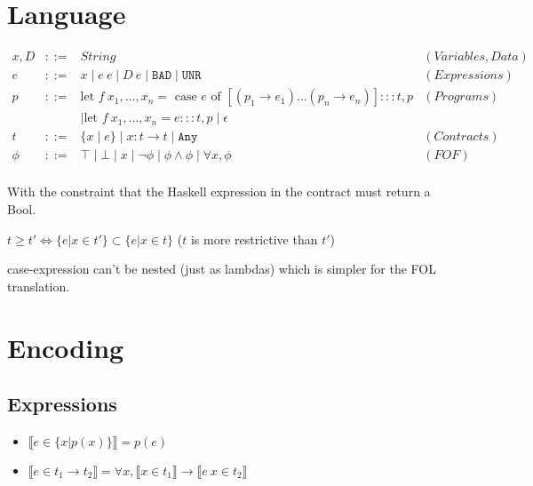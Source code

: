 \documentclass{article}
\begin{document}
\section{Language}

\newcommand{\unr}{\texttt{UNR}}
\newcommand{\unrphi}{\texttt{UNR}_\phi}
\newcommand{\bad}{\texttt{BAD}}
\newcommand{\badphi}{\texttt{BAD}_\phi}
\newcommand{\any}{\texttt{Any}}
\newcommand{\ok}{\texttt{Ok}}
\newcommand{\let}{\mbox{let }}
\newcommand{\mand}{\mbox{ and }}
\newcommand{\motherwise}{\mbox{ otherwise.}}

\begin{eqnarray*}
  x,D &::=& String & (Variables, Data)\\
  e &::=& x \mid e~e \mid D~e \mid \bad \mid \unr & (Expressions) \\
  p &::=& \mbox{let $f~x_1,\dots,x_n = $ case $e$ of } [(p_1 \to e_1) \dots (p_n \to e_n)] ::: t,p   & (Programs) \\ 
  &&\mid \mbox{let } f~x_1,\dots,x_n = e ::: t,p \mid \epsilon \\
  t &::=& \{x \mid e \} \mid x:t \to t \mid \any & (Contracts) \\
  \phi &::=& \top \mid \bot \mid x \mid \lnot \phi \mid \phi \land \phi \mid \forall x, \phi & (FOF) \\
\end{eqnarray*}

With the constraint that the Haskell expression in the contract must return a Bool.

$t \geq t' \iff \{ e | x \in t' \} \subset \{ e | x \in t \}$ ($t$ is more restrictive than $t'$)

case-expression can't be nested (just as lambdas) which is simpler for the FOL translation.

\section{Encoding}


\subsection{Expressions}
\begin{itemize}
\item $\llbracket e \in \{ x | p(x) \} \rrbracket = p(e)$
\item $\llbracket e \in t_1 \to t_2 \rrbracket = \forall x, \llbracket x \in t_1 \rrbracket \to \llbracket e~x \in t_2 \rrbracket$
\end{itemize}
\end{document}

